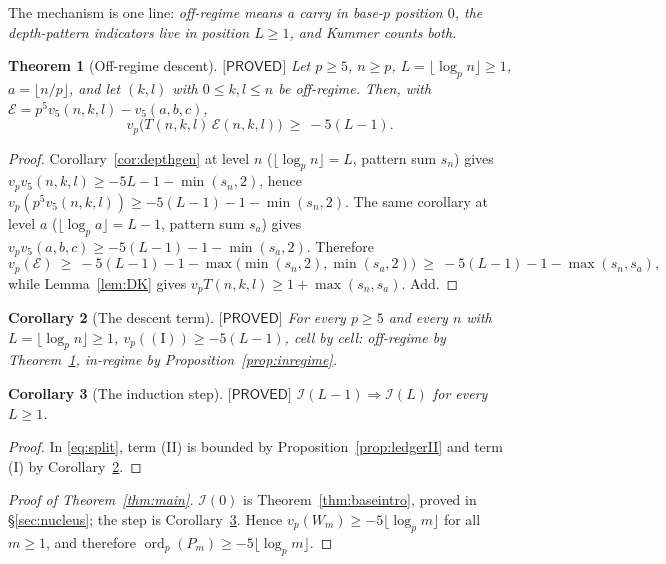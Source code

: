\documentclass[11pt,reqno]{amsart}
\theoremstyle{plain}
\newtheorem{theorem}{Theorem}[section]
\newtheorem{corollary}[theorem]{Corollary}
\theoremstyle{definition}
\theoremstyle{remark}
\numberwithin{equation}{section}
\newcommand{\ord}{\operatorname{ord}}
\newcommand{\Ecal}{\mathcal{E}}
\newcommand{\vfive}{v_5}
\newcommand{\PROVED}{\textsf{[PROVED]}}
\begin{document}
The mechanism is one line: \emph{off-regime means a carry in base-$p$ position $0$, the
depth-pattern indicators live in position $L\ge1$, and Kummer counts both.}

\begin{theorem}[Off-regime descent]\label{thm:gapdesc}
$\PROVED$ Let $p\ge5$, $n\ge p$, $L=\lfloor\log_pn\rfloor\ge1$, $a=\lfloor n/p\rfloor$, and let
$(k,l)$ with $0\le k,l\le n$ be off-regime. Then, with
$\Ecal=p^5\vfive(n,k,l)-\vfive(a,b,c)$,
\[
v_p\bigl(T(n,k,l)\,\Ecal(n,k,l)\bigr)\ \ge\ -5(L-1).
\]
\end{theorem}

\begin{proof}
Corollary~\ref{cor:depthgen} at level $n$ ($\lfloor\log_pn\rfloor=L$, pattern sum $s_n$) gives
$v_p\vfive(n,k,l)\ge-5L-1-\min(s_n,2)$, hence
$v_p(p^5\vfive(n,k,l))\ge-5(L-1)-1-\min(s_n,2)$. The same corollary at level $a$
($\lfloor\log_pa\rfloor=L-1$, pattern sum $s_a$) gives
$v_p\vfive(a,b,c)\ge-5(L-1)-1-\min(s_a,2)$. Therefore
\[
v_p(\Ecal)\ \ge\ -5(L-1)-1-\max\bigl(\min(s_n,2),\min(s_a,2)\bigr)\ \ge\ -5(L-1)-1-\max(s_n,s_a),
\]
while Lemma~\ref{lem:DK} gives $v_pT(n,k,l)\ge1+\max(s_n,s_a)$. Add.
\end{proof}

\begin{corollary}[The descent term]\label{cor:termI}
$\PROVED$ For every $p\ge5$ and every $n$ with $L=\lfloor\log_pn\rfloor\ge1$,
$v_p((\mathrm I))\ge-5(L-1)$, cell by cell: off-regime by Theorem~\ref{thm:gapdesc}, in-regime
by Proposition~\ref{prop:inregime}.
\end{corollary}

\begin{corollary}[The induction step]\label{cor:step}
$\PROVED$ $\mathcal I(L-1)\Rightarrow\mathcal I(L)$ for every $L\ge1$.
\end{corollary}

\begin{proof}
In \eqref{eq:split}, term (II) is bounded by Proposition~\ref{prop:ledgerII} and term (I) by
Corollary~\ref{cor:termI}.
\end{proof}

\begin{proof}[Proof of Theorem~\textup{\ref{thm:main}}]
$\mathcal I(0)$ is Theorem~\ref{thm:baseintro}, proved in \S\ref{sec:nucleus}; the step is
Corollary~\ref{cor:step}. Hence $v_p(W_m)\ge-5\lfloor\log_pm\rfloor$ for all $m\ge1$, and
therefore $\ord_p(P_m)\ge-5\lfloor\log_pm\rfloor$.
\end{proof}
\end{document}
